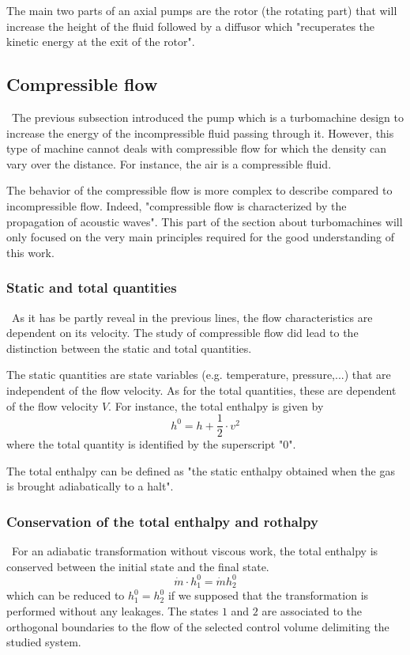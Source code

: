 The main two parts of an axial pumps are the rotor (the rotating part) that will increase the height of the fluid followed by a diffusor which "recuperates the kinetic energy at the exit of the rotor"\citep{Hillewaert2019}.

\subsection{Compressible flow}
\quad\, The previous subsection introduced the pump which is a turbomachine design to increase the energy of the incompressible fluid passing through it. However, this type of machine cannot deals with compressible flow for which the density can vary over the distance. For instance, the air is a compressible fluid. 

The behavior of the compressible flow is more complex to describe compared to incompressible flow. Indeed, "compressible flow is characterized by the propagation of acoustic waves"\citep{Hillewaert2019}.   This part of the section about turbomachines will only focused on the very main principles required for the good understanding of this work.

\subsubsection{Static and total quantities}
\quad\, As it has be partly reveal in the previous lines, the flow characteristics are dependent on its velocity. The study of compressible flow did lead to the distinction between the static and total quantities. 

The static quantities are state variables (e.g. temperature, pressure,...) that are independent of the flow velocity. As for the total quantities, these are dependent of the flow velocity $V$. For instance, the total enthalpy is given by
\begin{equation}
h^0 = h + \frac{1}{2}\cdot v^2\label{eq:C3_h0}
\end{equation}
where the total quantity is identified by the superscript "0".

The total enthalpy can be defined as "the static enthalpy obtained when the gas is brought adiabatically to a halt"\citep{Hillewaert2019}.


\subsubsection{Conservation of the total enthalpy and rothalpy}
\quad\, For an adiabatic transformation without viscous work, the total enthalpy is conserved between the initial state and the final state.
\begin{equation}
\dot{m}\cdot h_1^0 = \dot{m} h_2^0 \label{eq:C3_hcons}
\end{equation}
which can be reduced to $h_1^0 = h_2^0$ if we supposed that the transformation is performed without any leakages. The states $1$ and $2$ are associated to the orthogonal boundaries to the flow of the selected control volume delimiting the studied system. 


